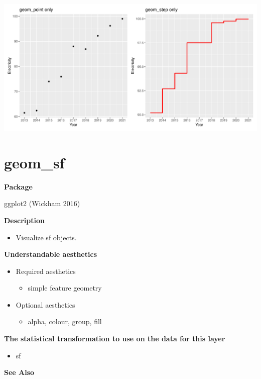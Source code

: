 \documentclass[
  letterpaper,
  DIV=11,
  numbers=noendperiod]{scrreprt}
\providecommand{\tightlist}{%
  \setlength{\itemsep}{0pt}\setlength{\parskip}{0pt}}\usepackage{longtable,booktabs,array}
\begin{document}
\includegraphics{s_files/figure-pdf/unnamed-chunk-8-1.pdf}

\section{geom\_sf}\label{geom_sf}

\textbf{Package}

ggplot2 (Wickham 2016)

\textbf{Description}

\begin{itemize}
\tightlist
\item
  Visualize sf objects.
\end{itemize}

\textbf{Understandable aesthetics}

\begin{itemize}
\tightlist
\item
  Required aesthetics

  \begin{itemize}
  \tightlist
  \item
    simple feature geometry
  \end{itemize}
\item
  Optional aesthetics

  \begin{itemize}
  \tightlist
  \item
    alpha, colour, group, fill
  \end{itemize}
\end{itemize}

\textbf{The statistical transformation to use on the data for this
layer}

\begin{itemize}
\tightlist
\item
  sf
\end{itemize}

\textbf{See Also}
\end{document}
